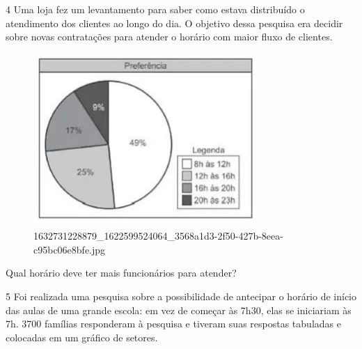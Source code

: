 \begin{escolha}
\begin{escolha}
\begin{escolha}
\begin{escolha}
{\begin{boxmedio}
\begin{boxpeq}
\begin{q°}
\begin{boxmedio}
\begin{boxpeq}
\begin{boxpeq}
\begin{boxmedio}
\begin{boxmedio}
\begin{boxmedio}
\begin{largebox}

\num{4} Uma loja fez um levantamento para saber como estava distribuído o
atendimento dos clientes ao longo do dia. O objetivo dessa pesquisa era decidir
sobre novas contratações para atender o horário com maior fluxo de clientes.

\begin{figure}
\centering
\includegraphics[width=3.32598in,height=2.58268in]{./_SAEB_9_MAT/media/image214.jpg}
\caption{1632731228879\_1622599524064\_3568a1d3-2f50-427b-8eea-c95bc06e8bfe.jpg}
\end{figure}


Qual horário deve ter mais funcionários para atender?



\num{5} Foi realizada uma pesquisa sobre a possibilidade de antecipar o horário
de início das aulas de uma grande escola: em vez de começar às 7h30, elas se iniciariam
às 7h. 3700 famílias responderam à pesquisa e tiveram suas respostas tabuladas e
colocadas em um gráfico de setores.


\end{largebox}
\end{boxmedio}
\end{boxmedio}
\end{boxmedio}
\end{boxpeq}
\end{boxpeq}
\end{boxmedio}
\end{q°}
\end{boxpeq}
\end{boxmedio}}
\end{escolha}
\end{escolha}
\end{escolha}
\end{escolha}
